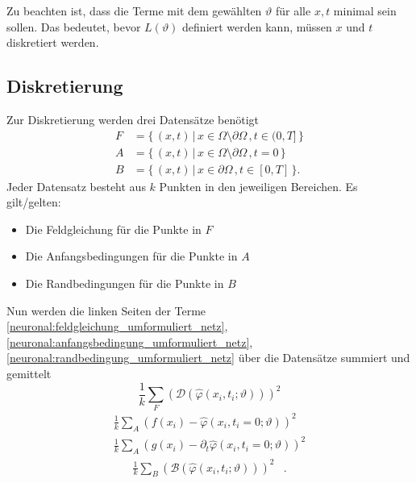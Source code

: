 Zu beachten ist, dass die Terme mit dem gewählten $\vartheta$ für alle $x, t$ minimal sein sollen.
Das bedeutet, bevor $L(\vartheta)$ definiert werden kann, müssen $x$ und $t$ diskretiert werden.

\subsection{Diskretierung}\label{neuronal:subsection:diskretierung}
Zur Diskretierung werden drei Datensätze benötigt
\begin{equation}
    \begin{aligned}
        F &= \{\, (x, t) \,|\, x \in \Omega \setminus \partial \Omega\,, t \in (0,T] \,\}\\
        A &= \{\, (x, t) \,|\, x \in \Omega \setminus \partial \Omega\,, t = 0 \,\}\\
        B &= \{\, (x, t) \,|\, x \in \partial \Omega\,, t \in [0, T] \,\}.
    \end{aligned}
\end{equation}
Jeder Datensatz besteht aus $k$ Punkten in den jeweiligen Bereichen.
Es gilt/gelten:
\begin{itemize}
    \item Die Feldgleichung für die Punkte in $F$
    \item Die Anfangsbedingungen für die Punkte in $A$
    \item Die Randbedingungen für die Punkte in $B$
\end{itemize}
Nun werden die linken Seiten der Terme \eqref{neuronal:feldgleichung_umformuliert_netz}, \eqref{neuronal:anfangsbedingung_umformuliert_netz}, \eqref{neuronal:randbedingung_umformuliert_netz} über die Datensätze summiert und gemittelt
\begin{equation}
    \frac{1}{k} \sum_{F}^{} \left(\mathcal{D}(\hat{\varphi}(x_i, t_i; \vartheta))\right)^2
    \label{neuronal:feldgleichung_umformuliert_netz_disk}
\end{equation}
\begin{equation}
    \begin{aligned}
        \frac{1}{k} \sum_{A}^{} \left(f(x_i) - \hat{\varphi}(x_i, t_i = 0; \vartheta)\right)^2\\
        \frac{1}{k} \sum_{A}^{} \left(g(x_i) - \partial_t \hat{\varphi}(x_i, t_i = 0; \vartheta)\right)^2
    \end{aligned}
    \label{neuronal:anfangsbedingung_umformuliert_netz_disk}
\end{equation}
\begin{equation}
    \begin{aligned}
        \frac{1}{k} \sum_{B}^{} \left(\mathcal{B}(\hat{\varphi}(x_i, t_i; \vartheta))\right)^2 &.
    \end{aligned}
    \label{neuronal:randbedingung_umformuliert_netz_disk}
\end{equation}
